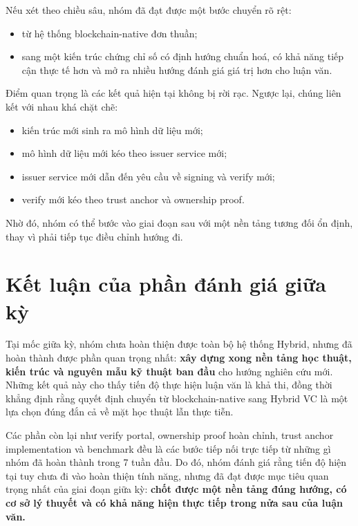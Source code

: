 Nếu xét theo chiều sâu, nhóm đã đạt được một bước chuyển rõ rệt:
\begin{itemize}
    \item từ hệ thống blockchain-native đơn thuần;
    \item sang một kiến trúc chứng chỉ số có định hướng chuẩn hoá, có khả năng tiếp cận thực tế hơn và mở ra nhiều hướng đánh giá giá trị hơn cho luận văn.
\end{itemize}

Điểm quan trọng là các kết quả hiện tại không bị rời rạc. Ngược lại, chúng liên kết với nhau khá chặt chẽ:
\begin{itemize}
    \item kiến trúc mới sinh ra mô hình dữ liệu mới;
    \item mô hình dữ liệu mới kéo theo issuer service mới;
    \item issuer service mới dẫn đến yêu cầu về signing và verify mới;
    \item verify mới kéo theo trust anchor và ownership proof.
\end{itemize}

Nhờ đó, nhóm có thể bước vào giai đoạn sau với một nền tảng tương đối ổn định, thay vì phải tiếp tục điều chỉnh hướng đi.

\section{Kết luận của phần đánh giá giữa kỳ}

Tại mốc giữa kỳ, nhóm chưa hoàn thiện được toàn bộ hệ thống Hybrid, nhưng đã hoàn thành được phần quan trọng nhất: \textbf{xây dựng xong nền tảng học thuật, kiến trúc và nguyên mẫu kỹ thuật ban đầu} cho hướng nghiên cứu mới. Những kết quả này cho thấy tiến độ thực hiện luận văn là khả thi, đồng thời khẳng định rằng quyết định chuyển từ blockchain-native sang Hybrid VC là một lựa chọn đúng đắn cả về mặt học thuật lẫn thực tiễn.

Các phần còn lại như verify portal, ownership proof hoàn chỉnh, trust anchor implementation và benchmark đều là các bước tiếp nối trực tiếp từ những gì nhóm đã hoàn thành trong 7 tuần đầu. Do đó, nhóm đánh giá rằng tiến độ hiện tại tuy chưa đi vào hoàn thiện tính năng, nhưng đã đạt được mục tiêu quan trọng nhất của giai đoạn giữa kỳ: \textbf{chốt được một nền tảng đúng hướng, có cơ sở lý thuyết và có khả năng hiện thực tiếp trong nửa sau của luận văn.}
